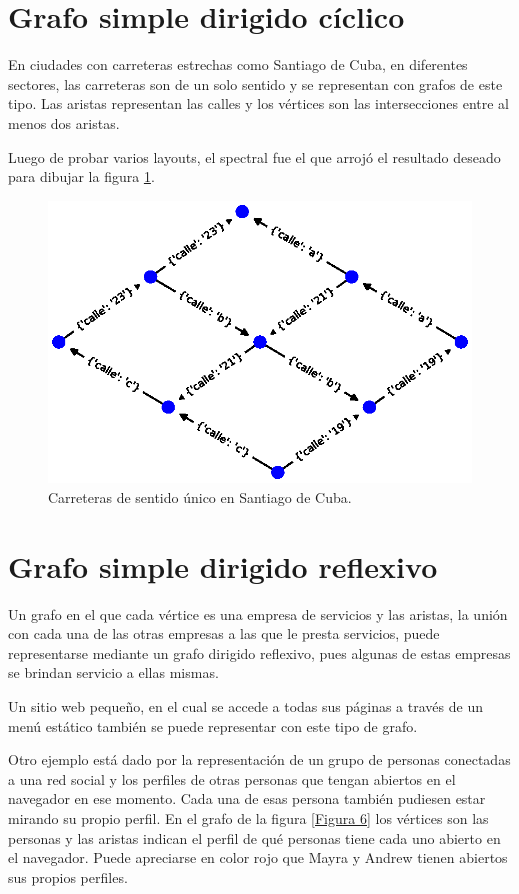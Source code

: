\documentclass{article}
\begin{document}
\section{Grafo simple dirigido cíclico}

En ciudades con carreteras estrechas como Santiago de Cuba, en diferentes sectores, las carreteras son de un solo sentido y se representan con grafos de este tipo. Las aristas representan las calles y los vértices son las intersecciones entre al menos dos aristas.

Luego de probar varios layouts, el spectral fue el que arrojó el resultado deseado para dibujar la figura \ref{Figura 5}.

\begin{figure}
  \includegraphics[width=.8\columnwidth]{fig5.eps}
  \caption{Carreteras de sentido único en Santiago de Cuba.}
  \label{Figura 5}
\end{figure}




\section{Grafo simple dirigido reflexivo}

Un grafo en el que cada vértice es una empresa de servicios y las aristas, la unión con cada una de las otras empresas a las que le presta servicios, puede representarse mediante un grafo dirigido reflexivo, pues algunas de estas empresas se brindan servicio a ellas mismas. 

Un sitio web pequeño, en el cual se accede a todas sus páginas a través de un menú estático también se puede representar con este tipo de grafo. 

Otro ejemplo está dado por la representación de un grupo de personas conectadas a una red social y los perfiles de otras personas que tengan abiertos en el navegador en ese momento. Cada una de esas persona también pudiesen estar mirando su propio
perfil. En el grafo de la figura \ref{Figura 6} los vértices son las personas y las aristas indican el perfil de qué personas tiene cada uno abierto en el navegador. Puede apreciarse en color rojo que Mayra y Andrew tienen abiertos sus propios perfiles.
\end{document}
